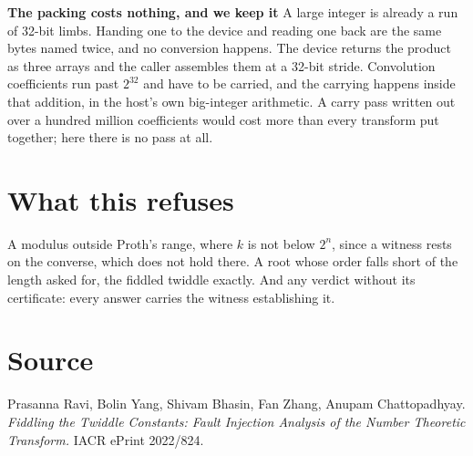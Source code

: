 \documentclass{article}
\begin{document}
\textbf{The packing costs nothing, and we keep it} A large integer is already a run of 32-bit limbs. Handing one to the device and reading one back are the same bytes named twice, and no conversion happens. The device returns the product as three arrays and the caller assembles them at a 32-bit stride. Convolution coefficients run past \(2^{32}\) and have to be carried, and the carrying happens inside that addition, in the host's own big-integer arithmetic. A carry pass written out over a hundred million coefficients would cost more than every transform put together; here there is no pass at all.

\section{What this refuses}

A modulus outside Proth's range, where \(k\) is not below \(2^n\), since a witness rests on the converse, which does not hold there. A root whose order falls short of the length asked for, the fiddled twiddle exactly. And any verdict without its certificate: every answer carries the witness establishing it.

\section{Source}

Prasanna Ravi, Bolin Yang, Shivam Bhasin, Fan Zhang, Anupam Chattopadhyay. \emph{Fiddling the Twiddle Constants: Fault Injection Analysis of the Number Theoretic Transform.} IACR ePrint 2022/824.
\end{document}
